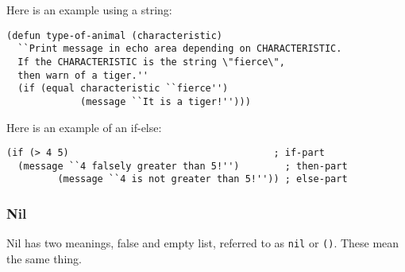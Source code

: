 \documentclass[12pt, letterpaper]{article}
\def\code#1{\texttt{#1}}
\begin{document}
Here is an example using a string:

\begin{lstlisting}[caption= If statement example with string]
  (defun type-of-animal (characteristic)
  ``Print message in echo area depending on CHARACTERISTIC.
  If the CHARACTERISTIC is the string \"fierce\",
  then warn of a tiger.''
  (if (equal characteristic ``fierce'')
             (message ``It is a tiger!'')))
\end{lstlisting}

Here is an example of an if-else:

\begin{lstlisting}[caption= If-else statement with int]
  (if (> 4 5)                                    ; if-part
  (message ``4 falsely greater than 5!'')        ; then-part
         (message ``4 is not greater than 5!'')) ; else-part
\end{lstlisting}

\subsubsection{Nil}
Nil has two meanings, false and empty list, referred to as \code{nil} or \code{()}. These mean the same thing.
\end{document}
